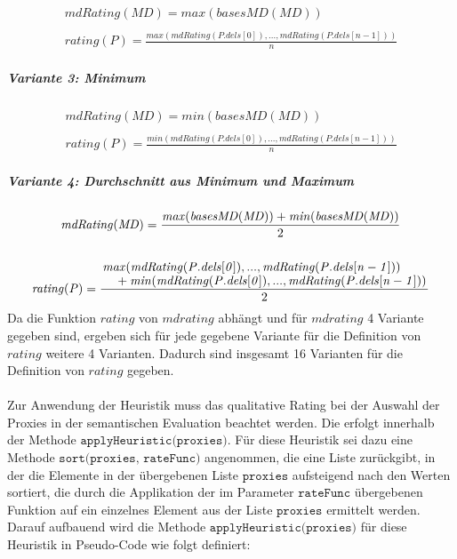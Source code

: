 \documentclass[a4paper,12pt]{article}
\begin{document}
\begin{gather*}
\mathit{mdRating(MD)} = \mathit{max(basesMD(MD))}
\\\\
\mathit{rating(P)} = \frac{\mathit{max(mdRating(P.dels[0]),...,mdRating(P.dels[n-1]))}}{n}
\end{gather*}



\subparagraph{Variante 3: Minimum}

\begin{gather*}
\mathit{mdRating(MD)} = \mathit{min(basesMD(MD))}
\\\\
\mathit{rating(P)} = \frac{\mathit{min(mdRating(P.dels[0]),...,mdRating(P.dels[n-1]))}}{n}
\end{gather*}

\subparagraph{Variante 4: Durchschnitt aus Minimum und Maximum}

\begin{gather*}
\mathit{mdRating(MD)} = \frac{\mathit{max(basesMD(MD))}+\mathit{min(basesMD(MD))}}{2}
\\\\
\mathit{rating(P)} = \frac{\splitfrac{ \mathit{max(mdRating(P.dels[0]),...,mdRating(P.dels[n-1]))}}{+\mathit{min(mdRating(P.dels[0]),...,mdRating(P.dels[n-1]))}}}{2}
\end{gather*}
\noindent
Da die Funktion $\mathit{rating}$ von $\mathit{mdrating}$ abhängt und für $\mathit{mdrating}$ 4 Variante gegeben sind, ergeben sich für jede gegebene Variante für die Definition von $\mathit{rating}$ weitere 4 Varianten. Dadurch sind insgesamt 16 Varianten für die Definition von $\mathit{rating}$ gegeben.\\\\

Zur Anwendung der Heuristik muss das qualitative Rating bei der Auswahl der Proxies in der semantischen Evaluation beachtet werden. Die erfolgt innerhalb der Methode $\texttt{applyHeuristic(proxies)}$. Für diese Heuristik sei dazu eine Methode $\texttt{sort(proxies, rateFunc)}$ angenommen, die eine Liste zurückgibt, in der die Elemente in der übergebenen Liste $\texttt{proxies}$ aufsteigend nach den Werten sortiert, die durch die Applikation der im Parameter $\texttt{rateFunc}$ übergebenen Funktion auf ein einzelnes Element aus der Liste $\texttt{proxies}$ ermittelt werden. Darauf aufbauend wird die Methode $\texttt{applyHeuristic(proxies)}$ für diese Heuristik in Pseudo-Code wie folgt definiert:
\end{document}
